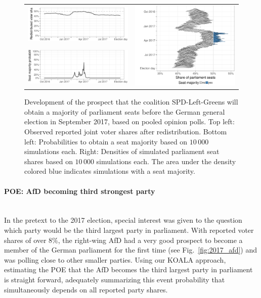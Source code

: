 \documentclass[smallcondensed]{svjour3}     %
\begin{document}
\begin{figure}[H]\centering
\begin{tabular}{ll}
\includegraphics[height=.15\textwidth]{figures/2017_pooled_spdleftgreens_rawSharesRedist.pdf}
&
\multirow{2}{*}[13ex]{\includegraphics[height=30ex]{figures/2017_pooled_spdleftgreens_ridgeline.pdf}}
\\
\includegraphics[height=.15\textwidth]{figures/2017_pooled_spdleftgreens_prob.pdf}
\end{tabular}
\caption{Development of the prospect that the coalition SPD-Left-Greens will
obtain a majority of parliament seats before the German
general election in September 2017, based on pooled opinion polls.
Top left: Observed reported joint voter shares after redistribution.
Bottom left: Probabilities to obtain a seat majority based on $10\,000$ simulations each.
Right: Densities of simulated parliament seat shares based on $10\,000$ simulations each.
The area under the density colored blue indicates simulations with a
seat majority.
\label{fig:2017_spdleftgreens}
}
\end{figure}

\paragraph{POE: AfD becoming third strongest party} \ \\
In the pretext to the 2017 election, special interest was given to the question
which party would be the third largest party in parliament.
With reported voter shares of over $8\%$, the right-wing AfD had a very good
prospect to become a member of the German parliament for the first time
(see Fig.~\ref{fig:2017_afd}) and was polling close to other smaller parties.
Using our KOALA approach, estimating the POE that the AfD becomes
the third largest party in parliament is straight forward, adequately summarizing
this event probability that simultaneously depends on all reported party shares.
\end{document}
